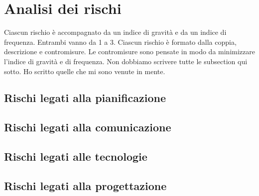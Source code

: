 \section{Analisi dei rischi}

Ciascun rischio è accompagnato da un indice di gravità e da un indice di
frequenza. Entrambi vanno da 1 a 3. Ciascun rischio è formato dalla coppia,
descrizione e contromisure. Le contromisure sono pensate in modo da
minimizzare l'indice di gravità e di frequenza. Non dobbiamo scrivere tutte le
subsection qui sotto. Ho scritto quelle che mi sono venute in mente.

\subsection{Rischi legati alla pianificazione}

\subsection{Rischi legati alla comunicazione}

\subsection{Rischi legati alle tecnologie}

\subsection{Rischi legati alla progettazione}
